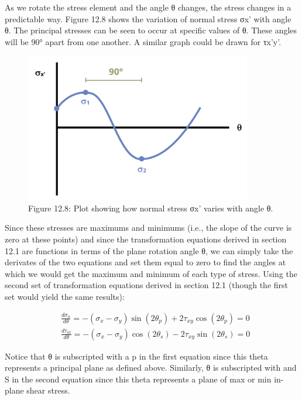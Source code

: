 \documentclass[
  letterpaper,
  DIV=11,
  numbers=noendperiod]{scrreprt}
\theoremstyle{definition}
\theoremstyle{remark}
\begin{document}
As we rotate the stress element and the angle θ changes, the stress
changes in a predictable way. Figure 12.8 shows the variation of normal
stress σx' with angle θ. The principal stresses can be seen to occur at
specific values of θ. These angles will be 90° apart from one another. A
similar graph could be drawn for τx'y'.

\begin{figure}[H]

{\centering \includegraphics[width=3.89583in,height=\textheight]{images/CH12 figures/figure 12.8.png}

}

\caption{Figure 12.8: Plot showing how normal stress σx' varies with
angle θ.}

\end{figure}%

Since these stresses are maximums and minimums (i.e., the slope of the
curve is zero at these points) and since the transformation equations
derived in section 12.1 are functions in terms of the plane rotation
angle θ, we can simply take the derivates of the two equations and set
them equal to zero to find the angles at which we would get the maximum
and minimum of each type of stress. Using the second set of
transformation equations derived in section 12.1 (though the first set
would yield the same results):

\[
\begin{aligned}
& \frac{d \sigma_n}{d \theta}=-\left(\sigma_x-\sigma_y\right) \sin \left(2 \theta_p\right)+2 \tau_{x y} \cos \left(2 \theta_p\right)=0 \\
& \frac{d \tau_{n t}}{d \theta}=-\left(\sigma_x-\sigma_y\right) \cos \left(2 \theta_s\right)-2 \tau_{x y} \sin \left(2 \theta_s\right)=0
\end{aligned}
\]

Notice that θ is subscripted with a p in the first equation since this
theta represents a principal plane as defined above. Similarly, θ is
subscripted with and S in the second equation since this theta
represents a plane of max or min in-plane shear stress.
\end{document}
